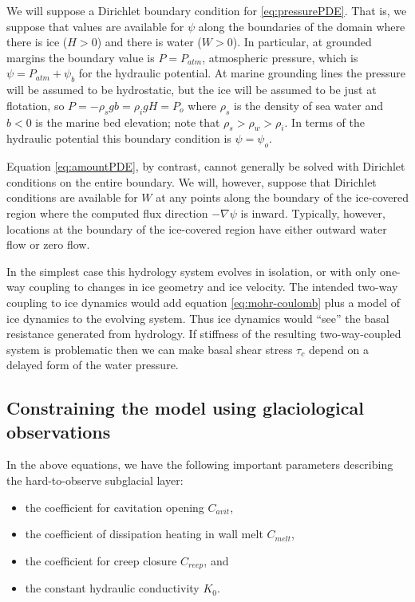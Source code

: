 \documentclass[11pt]{amsart}
\newcommand{\Cavit}{C_{avit}}
\newcommand{\Cmelt}{C_{melt}}
\newcommand{\Creep}{C_{reep}}
\begin{document}
We will suppose a Dirichlet boundary condition for \eqref{eq:pressurePDE}.  That is, we suppose that values are available for $\psi$ along the boundaries of the domain where there is ice ($H>0$) and there is water ($W>0$).  In particular, at grounded margins the boundary value is $P=P_{atm}$, atmospheric pressure, which is $\psi = P_{atm} + \psi_b$ for the hydraulic potential.  At marine grounding lines the pressure will be assumed to be hydrostatic, but the ice will be assumed to be just at flotation, so $P=-\rho_{s} g b = \rho_i g H = P_o$ where $\rho_s$ is the density of sea water and $b<0$ is the marine bed elevation; note that $\rho_s > \rho_w > \rho_i$.  In terms of the hydraulic potential this boundary condition is $\psi = \psi_o$.

Equation \eqref{eq:amountPDE}, by contrast, cannot generally be solved with Dirichlet conditions on the entire boundary.  We will, however, suppose that Dirichlet conditions are available for $W$ at any points along the boundary of the ice-covered region where the computed flux direction $-\nabla \psi$ is inward.  Typically, however, locations at the boundary of the ice-covered region have either outward water flow or zero flow.

In the simplest case this hydrology system evolves in isolation, or with only one-way coupling to changes in ice geometry and ice velocity.  The intended two-way coupling to ice dynamics would add equation \eqref{eq:mohr-coulomb} plus a model of ice dynamics to the evolving system.  Thus ice dynamics would ``see'' the basal resistance generated from hydrology.  If stiffness of the resulting two-way-coupled system is problematic then we can make basal shear stress $\tau_c$ depend on a delayed form of the water pressure.


\subsection*{Constraining the model using glaciological observations}  In the above equations, we have the following important parameters describing the hard-to-observe subglacial layer: 
\begin{itemize}
\item the coefficient for cavitation opening $\Cavit$,
\item the coefficient of dissipation heating in wall melt $\Cmelt$,
\item the coefficient for creep closure $\Creep$, and
\item the constant hydraulic conductivity $K_0$.
\end{itemize} 
\end{document}
